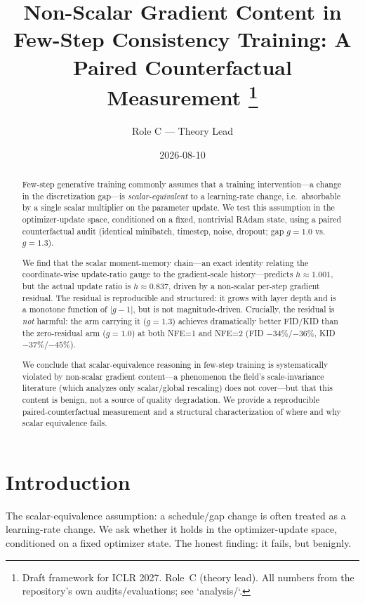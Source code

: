 \documentclass[11pt,a4paper]{article}
\title{\textbf{Non-Scalar Gradient Content in Few-Step Consistency Training: A Paired Counterfactual Measurement}%
\thanks{Draft framework for ICLR 2027. Role~C (theory lead). All numbers from the
repository's own audits/evaluations; see `analysis/`.}}
\author{Role C --- Theory Lead}
\date{2026-08-10}
\begin{document}
\maketitle

\begin{abstract}
Few-step generative training commonly assumes that a training intervention---a
change in the discretization gap---is \emph{scalar-equivalent} to a learning-rate
change, i.e.\ absorbable by a single scalar multiplier on the parameter update.
We test this assumption in the optimizer-update space, conditioned on a fixed,
nontrivial RAdam state, using a paired counterfactual audit (identical minibatch,
timestep, noise, dropout; gap $g=1.0$ vs.\ $g=1.3$).

We find that the scalar moment-memory chain---an exact identity relating the
coordinate-wise update-ratio gauge to the gradient-scale history---predicts
$h\approx 1.001$, but the actual update ratio is $h\approx 0.837$, driven by a
non-scalar per-step gradient residual. The residual is reproducible and
structured: it grows with layer depth and is a monotone function of $|g-1|$, but
is not magnitude-driven. Crucially, the residual is \emph{not} harmful: the arm
carrying it ($g=1.3$) achieves dramatically better FID/KID than the zero-residual
arm ($g=1.0$) at both NFE=1 and NFE=2 (FID $-34\%$/$-36\%$, KID $-37\%$/$-45\%$).

We conclude that scalar-equivalence reasoning in few-step training is
systematically violated by non-scalar gradient content---a phenomenon the field's
scale-invariance literature (which analyzes only scalar/global rescaling) does
not cover---but that this content is benign, not a source of quality degradation.
We provide a reproducible paired-counterfactual measurement and a structural
characterization of where and why scalar equivalence fails.
\end{abstract}

\tableofcontents

\section{Introduction}
\label{sec:intro}

The scalar-equivalence assumption: a schedule/gap change is often treated as a
learning-rate change. We ask whether it holds in the optimizer-update space,
conditioned on a fixed optimizer state. The honest finding: it fails, but
benignly.
\end{document}
